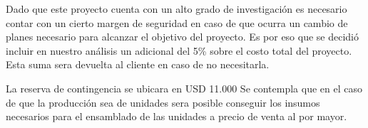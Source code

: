 Dado que este proyecto cuenta con un alto grado de investigación es necesario contar con un cierto margen de seguridad en caso de que ocurra un cambio de planes necesario para alcanzar el objetivo del proyecto. Es por eso que se decidió incluir en nuestro análisis un adicional del 5\% sobre el costo total del proyecto. Esta suma sera devuelta al cliente en caso de no necesitarla.

La reserva de contingencia se ubicara en  USD 11.000
Se contempla que en el caso de que la producción sea de \TBD unidades sera posible conseguir los insumos necesarios para el ensamblado de las unidades a precio de venta al por mayor. 
